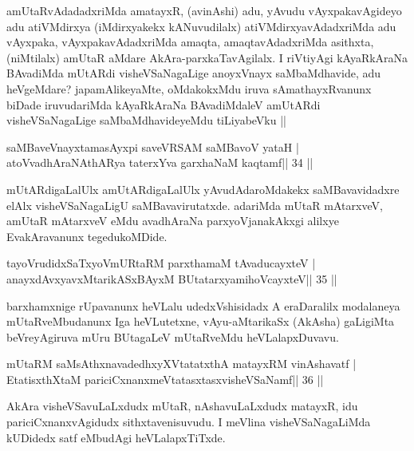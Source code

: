 \begin{artha}
amUtaRvAdadadxriMda amatayxR, (avinAshi) adu, yAvudu vAyxpakavAgideyo
adu atiVMdirxya (iMdirxyakekx kANuvudilalx) atiVMdirxyavAdadxriMda
adu vAyxpaka, vAyxpakavAdadxriMda amaqta, amaqtavAdadxriMda asithxta,
(niMtilalx) amUtaR aMdare AkAra-parxkaTavAgilalx. I riVtiyAgi
kAyaRkAraNa BAvadiMda mUtARdi visheVSaNagaLige anoyxVnayx saMbaMdhavide,
adu heVgeMdare? japamAlikeyaMte, oMdakokxMdu iruva sAmathayxRvanunx
biDade iruvudariMda kAyaRkAraNa BAvadiMdaleV amUtARdi visheVSaNagaLige
saMbaMdhavideyeMdu tiLiyabeVku ||
\end{artha}


\begin{shl}
saMBaveV\s nayxtamasAyxpi saveVRSAM saMBavoV yataH |
atoV\s vadhAraNAthARya taterxYva garxhaNaM kaqtamf\hfill || 34 ||
\end{shl}

\begin{artha}
mUtARdigaLalUlx amUtARdigaLalUlx yAvudAdaroMdakekx saMBavavidadxre elAlx visheVSaNagaLigU saMBavavirutatxde. adariMda mUtaR mAtarxveV, amUtaR mAtarxveV eMdu avadhAraNa parxyoVjanakAkxgi alilxye EvakAravanunx tegedukoMDide.
\end{artha}



\begin{shl}
tayoVrudidxSaTxyoVmURtaRM parxthamaM tAvaducayxteV |
anayxdAvxyavxMtarikASxBAyxM BUtatarxyamihoVcayxteV\hfill || 35 ||
\end{shl}

\begin{artha}
barxhamxnige rUpavanunx heVLalu udedxVshisidadx A eraDaralilx modalaneya mUtaRveMbudanunx Iga heVLutetxne, vAyu-aMtarikaSx (AkAsha) gaLigiMta beVreyAgiruva mUru BUtagaLeV mUtaRveMdu heVLalapxDuvavu.
\end{artha}



\begin{shl}
mUtaRM saMsAthxnavadedhxyXVtatatxthA matayxRM vinAshavatf |
EtatisxthXtaM pariciCxnanxmeVtatasxtasxvisheVSaNamf\hfill || 36 ||
\end{shl}

\begin{artha}
AkAra visheVSavuLaLxdudx mUtaR, nAshavuLaLxdudx matayxR, idu
pariciCxnanxvAgidudx sithxtavenisuvudu. I meVlina visheVSaNagaLiMda
kUDidedx satf eMbudAgi heVLalapxTiTxde.
\end{artha}

